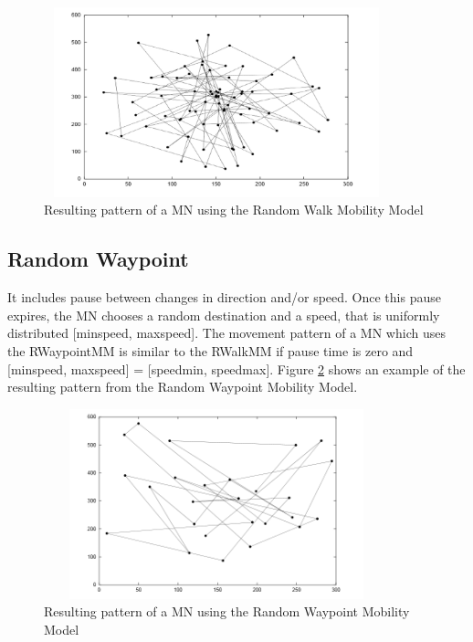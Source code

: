 \begin{figure}[h]
\center
\includegraphics[width=10cm,height=55mm]{../images/randomwalk1.png}
\caption{\label{RandomWalkFig}Resulting pattern of a MN using the Random Walk Mobility Model\cite{SurveyMobilityModelsAdHoc1}}
\end{figure}

\newpage

\subsection{Random Waypoint}

It includes pause between changes in direction and/or speed. Once this pause expires, the MN chooses a random destination and a speed, that is uniformly distributed [minspeed, maxspeed]. The movement pattern of a MN which uses the RWaypointMM is similar to the RWalkMM if pause time is zero and [minspeed, maxspeed] = [speedmin, speedmax]. Figure \ref{RandomWaypointFig} shows an example of the resulting pattern from the Random Waypoint Mobility Model.\\

\begin{figure}[h]
\center
\includegraphics[width=10cm,height=55mm]{../images/randomwaypoint1.png}
\caption{\label{RandomWaypointFig}Resulting pattern of a MN using the Random Waypoint Mobility Model\cite{SurveyMobilityModelsAdHoc1}}
\end{figure}

